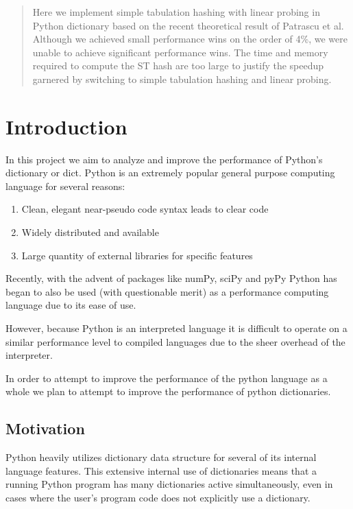 \documentclass[11pt]{article}
\begin{document}
\maketitle

\begin{abstract}
Here we implement simple tabulation hashing with linear probing in Python dictionary based on the recent theoretical result of Patrascu et al. Although we achieved small performance wins on the order of 4\%, we were unable to achieve significant performance wins.  The time and memory required to compute the ST hash are too large to justify the speedup garnered by switching to simple tabulation hashing and linear probing.
\end{abstract}


\section{Introduction}
In this project we aim to analyze and improve the performance of Python's dictionary or dict.  Python is an extremely popular general purpose computing language for several reasons:
\begin{enumerate}
 \item Clean, elegant near-pseudo code syntax leads to clear code 
 \item Widely distributed and available
 \item Large quantity of external libraries for specific features 
\end{enumerate}

Recently, with the advent of packages like numPy, sciPy and pyPy Python has began to also be used (with questionable merit) as a performance computing language due to its ease of use.

However, because Python is an interpreted language it is difficult to operate on a similar performance level to compiled languages due to the sheer overhead of the interpreter.

In order to attempt to improve the performance of the python language as a whole we plan to attempt to improve the performance of python dictionaries.

\subsection{Motivation}
Python heavily utilizes dictionary data structure for several of its internal language features. This extensive internal use of dictionaries means that a running Python program has many dictionaries active simultaneously, even in cases where the user's program code does not explicitly use a dictionary. 
\end{document}

